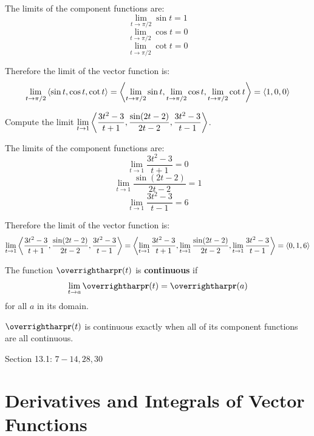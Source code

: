 \documentclass[letterpaper, twoside, 12pt]{book}
\begin{document}
          \begin{solution}
  The limits of the component functions are:
  \[
    \lim_{t\to \pi/2} \sin t = 1
  \]
  \[
    \lim_{t\to \pi/2} \cos t = 0
  \]
  \[
    \lim_{t\to \pi/2} \cot t = 0
  \]

  Therefore the limit of the vector function is:
  \[
    \lim_{t\to \pi/2} \left\langle\sin t, \cos t, \cot t\right\rangle
      =
    \left\langle
      \lim_{t\to \pi/2} \sin t,
      \lim_{t\to \pi/2} \cos t,
      \lim_{t\to \pi/2} \cot t
    \right\rangle
      =
    \langle1,0,0\rangle
  \]
          \end{solution}

          \begin{problem}
            Compute the limit
            $\displaystyle\lim_{t\to 1} \left\langle\frac{3t^2-3}{t+1}, \frac{\sin(2t-2)}{2t-2},\frac{3t^2-3}{t-1}\right\rangle$.
          \end{problem}

          \begin{solution}
  The limits of the component functions are:
  \[
    \lim_{t\to 1} \frac{3t^2-3}{t+1} = 0
  \]
  \[
    \lim_{t\to 1} \frac{\sin(2t-2)}{2t-2} = 1
  \]
  \[
    \lim_{t\to 1} \frac{3t^2-3}{t-1} = 6
  \]

  Therefore the limit of the vector function is:
  \[
    \lim_{t\to 1}
    \left\langle
      \frac{3t^2-3}{t+1},
      \frac{\sin(2t-2)}{2t-2},
      \frac{3t^2-3}{t-1}
    \right\rangle
      =
    \left\langle
      \lim_{t\to 1} \frac{3t^2-3}{t+1},
      \lim_{t\to 1} \frac{\sin(2t-2)}{2t-2},
      \lim_{t\to 1} \frac{3t^2-3}{t-1}
    \right\rangle
      =
    \langle0,1,6\rangle
  \]
          \end{solution}



\begin{definition}
  The function $\vect{r}(t)$ is \textbf{continuous} if
  \[\lim_{t\to a}\vect{r}(t) = \vect{r}(a)\]
  for all $a$ in its domain.
\end{definition}

\begin{theorem}
  $\vect{r}(t)$ is continuous exactly when all of its component
  functions are all continuous.
\end{theorem}

\begin{suggestedHW}
  Section 13.1: $7-14, 28, 30$
\end{suggestedHW}

\section{Derivatives and Integrals of Vector Functions}
\end{document}
